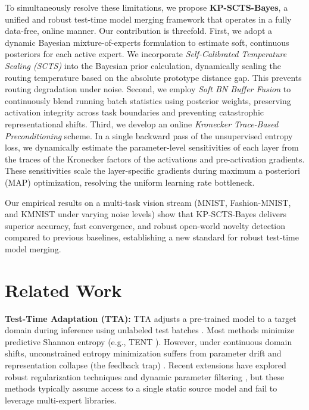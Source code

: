\documentclass{article}
\theoremstyle{plain}
\theoremstyle{definition}
\theoremstyle{remark}
\begin{document}
To simultaneously resolve these limitations, we propose \textbf{KP-SCTS-Bayes}, a unified and robust test-time model merging framework that operates in a fully data-free, online manner. Our contribution is threefold. First, we adopt a dynamic Bayesian mixture-of-experts formulation to estimate soft, continuous posteriors for each active expert. We incorporate \textit{Self-Calibrated Temperature Scaling (SCTS)} into the Bayesian prior calculation, dynamically scaling the routing temperature based on the absolute prototype distance gap. This prevents routing degradation under noise. Second, we employ \textit{Soft BN Buffer Fusion} to continuously blend running batch statistics using posterior weights, preserving activation integrity across task boundaries and preventing catastrophic representational shifts. Third, we develop an online \textit{Kronecker Trace-Based Preconditioning} scheme. In a single backward pass of the unsupervised entropy loss, we dynamically estimate the parameter-level sensitivities of each layer from the traces of the Kronecker factors of the activations and pre-activation gradients. These sensitivities scale the layer-specific gradients during maximum a posteriori (MAP) optimization, resolving the uniform learning rate bottleneck.

Our empirical results on a multi-task vision stream (MNIST, Fashion-MNIST, and KMNIST under varying noise levels) show that KP-SCTS-Bayes delivers superior accuracy, fast convergence, and robust open-world novelty detection compared to previous baselines, establishing a new standard for robust test-time model merging.

\section{Related Work}
\label{submission-sec:related}
\textbf{Test-Time Adaptation (TTA):} TTA adjusts a pre-trained model to a target domain during inference using unlabeled test batches \cite{wang2020tent, niu2022efficient}. Most methods minimize predictive Shannon entropy (e.g., TENT \cite{wang2020tent}). However, under continuous domain shifts, unconstrained entropy minimization suffers from parameter drift and representation collapse (the feedback trap) \cite{liang2023comprehensive}. Recent extensions have explored robust regularization techniques \cite{niu2023towards} and dynamic parameter filtering \cite{zhao2023delta}, but these methods typically assume access to a single static source model and fail to leverage multi-expert libraries.
\end{document}
